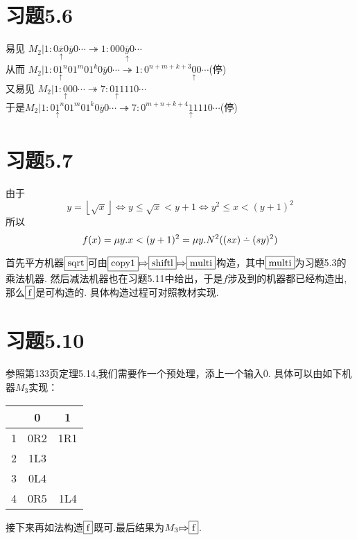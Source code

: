 \documentclass{article}
\newcommand*{\pt}[1]{\ensuremath{\underset{\uparrow}{#1}}}
\newcommand{\RA}[0]{{\shortmid\!\Rightarrow}}
\newcommand{\floor}[1]{\left\lfloor #1 \right\rfloor}
\def\dotminus{\mathbin{\ooalign{\hss\raise1ex\hbox{.}\hss\cr
  \mathsurround=0pt$-$}}}
\begin{document}
\section*{习题5.6}
易见
$M_2|1:0\pt{\overline x} 0 \overline y 0 \cdots \twoheadrightarrow 1 : 000\pt{\overline y} 0 \cdots$\\
从而
$M_2|1:0\pt1^n01^m01^k 0 \overline y 0 \cdots \twoheadrightarrow 1 : 0^{n+m+k+3}\pt0 0 \cdots$(停)\\
又易见
$M_2|1:\pt0 0 0 \cdots \twoheadrightarrow 7 : 0\pt1111 0 \cdots$\\
于是$M_2|1:0\pt1^n01^m01^k 0 \overline y 0 \cdots \twoheadrightarrow
7 : 0^{m+n+k+4}\pt1111 0 \cdots$(停)

\section*{习题5.7}

由于$$y=\floor{\sqrt{x}}\Leftrightarrow y \le \sqrt x < y + 1 \Leftrightarrow y^2 \le x < (y+1)^2$$
所以
$$f(x) = \mu y. x < (y+1)^2 = \mu y. N^2((sx)\dotminus(sy)^2)$$

首先平方机器$\fbox{sqrt}$可由$\fbox{copy1}\RA\fbox{shiftl}\RA\fbox{multi}$构造，其中$\fbox{multi}$为习题5.3的乘法机器. 然后减法机器也在习题5.11中给出，于是$f$涉及到的机器都已经构造出, 那么$\fbox{f}$是可构造的. 具体构造过程可对照教材实现. 

\section*{习题5.10}
参照第133页定理5.14,我们需要作一个预处理，添上一个输入$\overline 0$. 具体可以由如下机器$M_3$实现：
\begin{center}
\begin{tabular}{|c|c|c|}
	\hline
	&0&1\\
	\hline
	1&0R2&1R1\\
	2&1L3&\\
	3&0L4&\\
	4&0R5&1L4
	\\
	\hline
\end{tabular}
\end{center}
接下来再如法构造$\fbox{f}$既可.最后结果为$M_3\RA\fbox f$.
\end{document}
